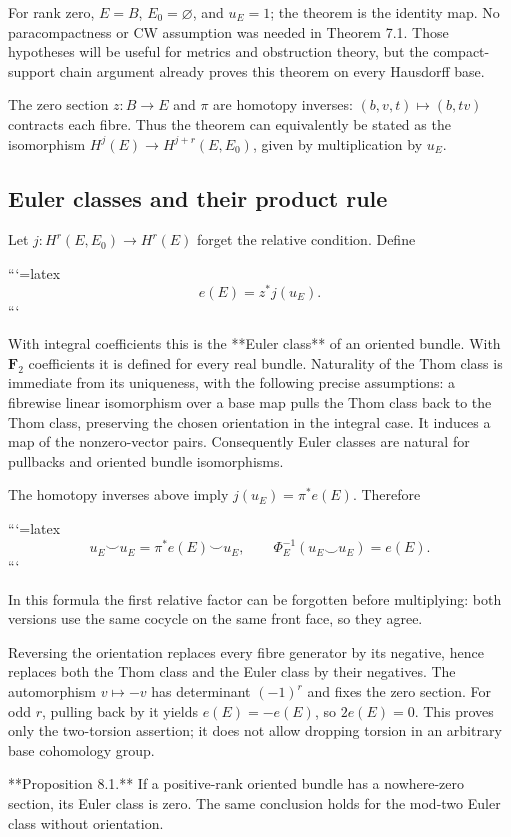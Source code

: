 \begin{theorem}
For rank zero, \(E=B\), \(E_0=\varnothing\), and \(u_E=1\); the theorem is the identity map. No paracompactness or CW assumption was needed in Theorem 7.1. Those hypotheses will be useful for metrics and obstruction theory, but the compact-support chain argument already proves this theorem on every Hausdorff base.

The zero section \(z:B\to E\) and \(\pi\) are homotopy inverses: \((b,v,t)\mapsto(b,tv)\) contracts each fibre. Thus the theorem can equivalently be stated as the isomorphism \(H^j(E)\to H^{j+r}(E,E_0)\), given by multiplication by \(u_E\).

\subsection{Euler classes and their product rule}
\label{courseIII:thom-euler-for-lesson11:section-8}

Let \(j:H^r(E,E_0)\to H^r(E)\) forget the relative condition. Define



```{=latex}
\[
e(E)=z^*j(u_E).
\]
```



With integral coefficients this is the **Euler class** of an oriented bundle. With \(\mathbf F_2\) coefficients it is defined for every real bundle. Naturality of the Thom class is immediate from its uniqueness, with the following precise assumptions: a fibrewise linear isomorphism over a base map pulls the Thom class back to the Thom class, preserving the chosen orientation in the integral case. It induces a map of the nonzero-vector pairs. Consequently Euler classes are natural for pullbacks and oriented bundle isomorphisms.

The homotopy inverses above imply \(j(u_E)=\pi^*e(E)\). Therefore



```{=latex}
\[
u_E\smile u_E=\pi^*e(E)\smile u_E,
\qquad \Phi_E^{-1}(u_E\smile u_E)=e(E).
\]
```



In this formula the first relative factor can be forgotten before multiplying: both versions use the same cocycle on the same front face, so they agree.

Reversing the orientation replaces every fibre generator by its negative, hence replaces both the Thom class and the Euler class by their negatives. The automorphism \(v\mapsto-v\) has determinant \((-1)^r\) and fixes the zero section. For odd \(r\), pulling back by it yields \(e(E)=-e(E)\), so
\(2e(E)=0\).
This proves only the two-torsion assertion; it does not allow dropping torsion in an arbitrary base cohomology group.

\label{courseIII:thom-euler-for-lesson11:CG-S6-CHAIN-PROPOSITION-8.1}
**Proposition 8.1.** If a positive-rank oriented bundle has a nowhere-zero section, its Euler class is zero. The same conclusion holds for the mod-two Euler class without orientation.
\end{theorem}
